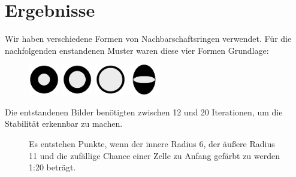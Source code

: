 \documentclass[]{article}
\begin{document}
\section{Ergebnisse}

Wir haben verschiedene Formen von Nachbarschaftsringen verwendet. F\"ur die nachfolgenden enstandenen Muster waren diese vier Formen Grundlage: \\


\begin{figure}[h]
	\begin{center}
		\includegraphics[width=0.12\textwidth]{Innen_klein.png}
		\hspace{10pt}
		\includegraphics[width=0.12\textwidth]{Innen_mittel.png}
		\hspace{10pt}
		\includegraphics[width=0.12\textwidth]{Innen_gross.png}
		\hspace{10pt}
		\includegraphics[width=0.12\textwidth]{Ellipsen.png}
	\end{center}
\end{figure}

\vspace{5pt}

Die entstandenen Bilder ben\"otigten zwischen 12 und 20 Iterationen, um die Stabilit\"at erkennbar zu machen.

\begin{figure}[h!]
	\caption{Es entstehen Punkte, wenn der innere Radius 6, der \"au\ss ere Radius 11 und die zuf\"allige Chance einer Zelle zu Anfang gef\"arbt zu werden 1:20 betr\"agt.}
\end{figure}
\end{document}
